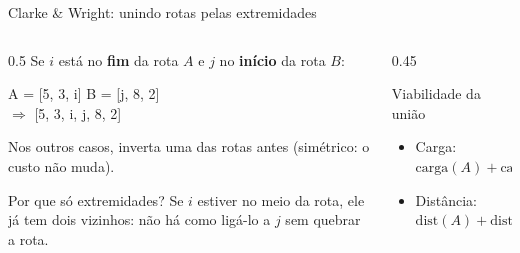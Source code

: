 \documentclass[aspectratio=169,xcolor=table]{beamer}
\begin{document}
\begin{frame}{Clarke \& Wright: unindo rotas pelas extremidades}
  \begin{columns}[c]
    \begin{column}{0.5\textwidth}
      Se $i$ está no \textbf{fim} da rota $A$ e $j$ no \textbf{início} da rota $B$:
      \begin{center}
        \ttfamily\small
        A = [5, 3, \textcolor{laranja}{i}] \quad B = [\textcolor{laranja}{j}, 8, 2]\\[0.3em]
        $\Rightarrow$ [5, 3, \textcolor{laranja}{i}, \textcolor{laranja}{j}, 8, 2]
      \end{center}
      \vspace{0.5em}
      Nos outros casos, inverta uma das rotas antes (simétrico: o custo não muda).
      \vspace{0.5em}
      \begin{block}{Por que só extremidades?}
        \small
        Se $i$ estiver no meio da rota, ele já tem dois vizinhos: não há como ligá-lo a $j$ sem quebrar a rota.
      \end{block}
    \end{column}
    \begin{column}{0.45\textwidth}
      \begin{block}{Viabilidade da união}
        \begin{itemize}
          \item Carga: $\text{carga}(A) + \text{carga}(B) \le Q$
          \item Distância: \\
            \small$\text{dist}(A) + \text{dist}(B) - s_{ij} \le L$
        \end{itemize}
      \end{block}
    \end{column}
  \end{columns}
\end{frame}
\end{document}
